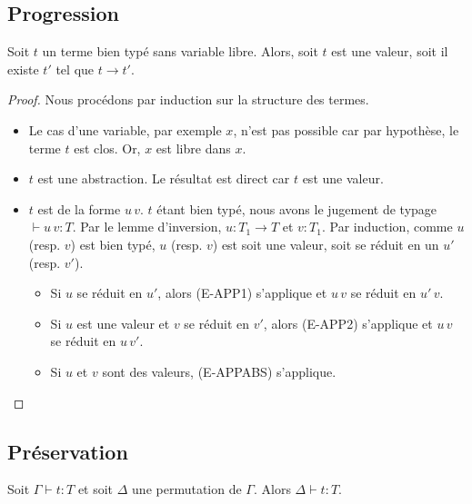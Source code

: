 \subsection*{Progression}

\begin{theorem} 
  \label{thm:simply-typed-lambda-calculus-progression}
  Soit $t$ un terme bien typé sans variable libre. Alors, soit $t$ est une
  valeur, soit il existe $t'$ tel que $t \rightarrow t'$.
\end{theorem}

\begin{proof}
  \label{proof:simply-typed-lambda-calculus-progression}
  Nous procédons par induction sur la structure des termes.
  \begin{itemize}
    \item Le cas d'une variable, par exemple $x$, n'est pas possible car par
      hypothèse, le terme $t$ est clos. Or, $x$ est libre dans $x$.
    \item $t$ est une abstraction. Le résultat est direct car $t$ est une valeur.
    \item $t$ est de la forme $u \, v$. $t$ étant
      bien typé, nous avons le jugement de typage $\vdash u \, v : T$. Par le lemme
      d'inversion, $u : T_{1} \rightarrow T$ et $v : T_{1}$. Par induction,
      comme $u$ (resp. $v$) est bien typé, $u$ (resp. $v$) est soit une valeur,
      soit se réduit en un $u'$ (resp. $v'$).
      \begin{itemize}
        \item Si $u$ se réduit en $u'$, alors (E-APP1) s'applique et $u \, v$
          se réduit en $u' \, v$.
        \item Si $u$ est une valeur et $v$ se réduit en $v'$, alors (E-APP2)
          s'applique et $u \, v$ se réduit en $u \, v'$.
        \item Si $u$ et $v$ sont des valeurs, (E-APPABS) s'applique.
      \end{itemize}
  \end{itemize}
\end{proof}

\subsection*{Préservation}

\begin{lemma} [de permutation]
  \label{thm:simply-typed-lambda-calculus-permutation}
  Soit $\Gamma \vdash t : T$ et soit $\Delta$ une permutation de $\Gamma$. Alors
  $\Delta \vdash t : T$.
\end{lemma}

